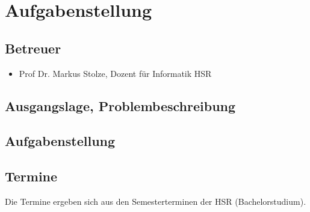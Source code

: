 \newpage
{}
\chapter*{Aufgabenstellung}
\label{cha:aufgabenstellung}

\section*{Betreuer}
\begin{itemize}
	\item Prof Dr. Markus Stolze, Dozent für Informatik HSR
\end{itemize}

\section*{Ausgangslage, Problembeschreibung}
\lipsum[2-3]

\section*{Aufgabenstellung}
\lipsum[2-3]

\section*{Termine}
Die Termine ergeben sich aus den Semesterterminen der HSR (Bachelorstudium).
